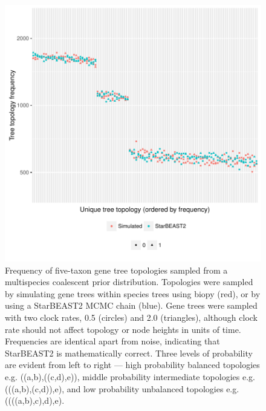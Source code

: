 \documentclass[12pt]{article}
\begin{document}
\clearpage

\begin{figure}[htb!]
\centering
\includegraphics[width=16cm]{gene_topology_frequencies.pdf}
\caption
{Frequency of five-taxon gene tree topologies sampled from a multispecies
coalescent prior distribution. Topologies were sampled by simulating gene trees
within species trees using biopy (red), or by using a StarBEAST2 MCMC chain
(blue). Gene trees were sampled with two clock rates, 0.5 (circles) and 2.0
(triangles), although clock rate should not affect topology or node heights in
units of time. Frequencies are identical apart from noise, indicating that
StarBEAST2 is mathematically correct. Three levels of probability are evident
from left to right --- high probability balanced topologies e.g.
((a,b),((c,d),e)), middle probability intermediate topologies e.g.
(((a,b),(c,d)),e), and low probability unbalanced topologies e.g.
((((a,b),c),d),e).}
\label{fig:geneTopologyFrequencies}
\end{figure}

\clearpage
\end{document}
